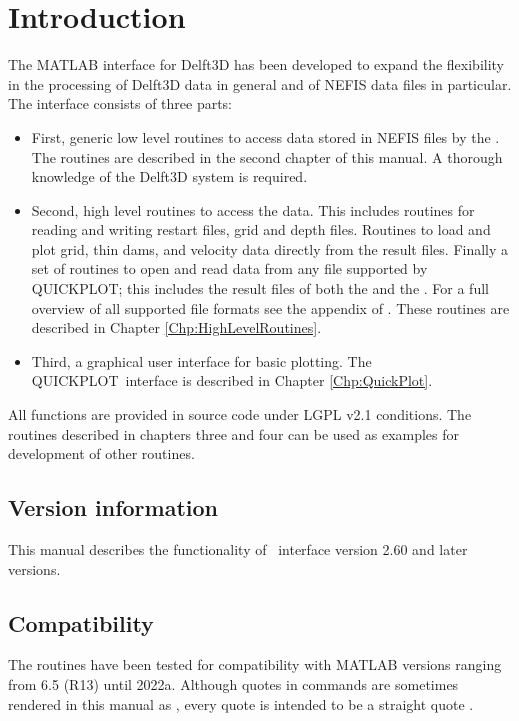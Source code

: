 
\chapter{Introduction}
The MATLAB interface for Delft3D has been developed to expand the flexibility in the processing of Delft3D data in general and of NEFIS data files in particular.
The interface consists of three parts:

\begin{itemize}
\item First, generic low level routines to access data stored in NEFIS files by the \dfoursuite.
The routines are described in the second chapter of this manual.
A thorough knowledge of the Delft3D system is required.

\item Second, high level routines to access the data.
This includes routines for reading and writing \dflow restart files, grid and depth files.
Routines to load and plot grid, thin dams, and velocity data directly from the \dfoursuite result files.
Finally a set of routines to open and read data from any file supported by QUICKPLOT; this includes the result files of both the \dfoursuite and the \dfmsuite.
For a full overview of all supported file formats see the appendix of \citet{QP_UM}.
These routines are described in Chapter \ref{Chp:HighLevelRoutines}.

\item Third, a graphical user interface for basic plotting.
The QUICKPLOT\ interface is described in Chapter \ref{Chp:QuickPlot}.
\end{itemize}

All functions are provided in source code under LGPL v2.1 conditions.
The routines described in chapters three and four can be used as examples for development of other routines.

\section{Version information}
This manual describes the functionality of \DMATLAB\ interface version 2.60 and later versions.

\section{Compatibility}
The routines have been tested for compatibility with MATLAB versions ranging from 6.5 (R13) until 2022a.
Although quotes in commands are sometimes rendered in this manual as , every quote is intended to be a straight quote .

